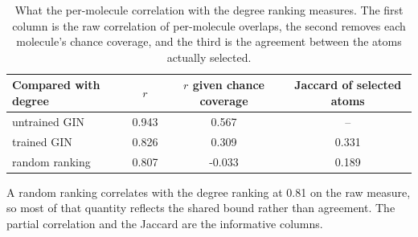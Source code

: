 \begin{table}[htbp]
\centering
\caption{What the per-molecule correlation with the degree ranking measures. The first column is the raw correlation of per-molecule overlaps, the second removes each molecule's chance coverage, and the third is the agreement between the atoms actually selected.}
\label{tab:correlation}
\small
\setlength{\tabcolsep}{4pt}
\begin{tabular}{lccc}
\toprule
Compared with degree & $r$ & $r$ given chance coverage & Jaccard of selected atoms \\
\midrule
untrained GIN & 0.943 & 0.567 & -- \\
trained GIN & 0.826 & 0.309 & 0.331 \\
random ranking & 0.807 & -0.033 & 0.189 \\
\bottomrule
\end{tabular}
\begin{flushleft}\footnotesize A random ranking correlates with the degree ranking at 0.81 on the raw measure, so most of that quantity reflects the shared bound rather than agreement. The partial correlation and the Jaccard are the informative columns.\end{flushleft}
\end{table}

